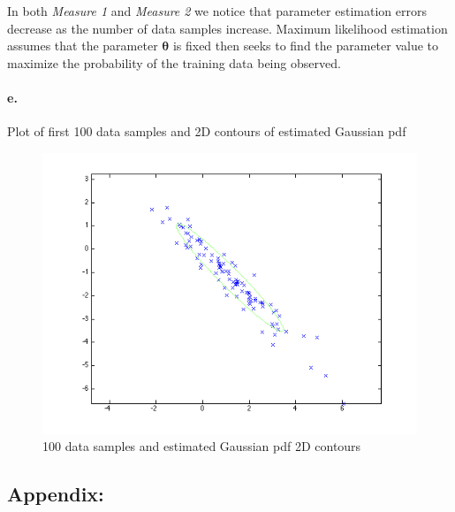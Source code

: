 \documentclass[a4paper]{article}
\begin{document}
In both \emph{Measure 1} and \emph{Measure 2} we notice that parameter estimation errors decrease as the number of data samples increase. Maximum likelihood estimation assumes that the parameter $\boldsymbol{\theta}$ is fixed then seeks to find the parameter value to maximize the probability of the training data being observed.

\paragraph{e.} Plot of first 100 data samples and 2D contours of estimated Gaussian pdf \\
\begin{figure}[H]
  \centering
    \includegraphics[scale=.44]{images/3_f_II.png}
  \caption{100 data samples and estimated Gaussian pdf 2D contours}
\end{figure}

\newpage
\subsection*{Appendix:}






\end{document}
